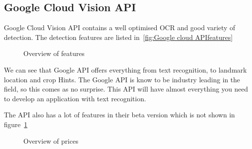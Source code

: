 \subsection{Google Cloud Vision API}\label{subsec:API_Google}

Google Cloud Vision API contains a well optimised OCR and good variety of detection.
The detection features are listed in~\ref{fig:Google cloud APIfeatures}

\begin{figure}[h]
    \caption{Overview of features~\cite{GoogleCloudPricing}}
    \label{fig:Google cloud API features}
\end{figure}

We can see that Google API offers everything from text recognition, to landmark location and crop Hints.
The Google API is know to be industry leading in the field, so this comes as no surprise.
This API will have almost everything you need to develop an application with text recognition.

The API also has a lot of features in their beta version which is not shown in figure~\ref{fig:Google cloud API features}
\clearpage

\begin{figure}[h]
    \caption{Overview of prices~\cite{GoogleCloudPricing}}
    \label{fig:Google cloud API prices}
\end{figure}

